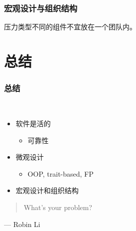 \documentclass[UTF8,lualatex]{ctexbeamer}
\newcommand{\pagequote}[2]{
  \Large
  \begin{quotation}
      #1
  \end{quotation}
  \flushright\normalsize --- {#2}
}
\begin{document}
\begin{frame}
    \frametitle{宏观设计与组织结构}
    \begin{corollary}
        压力类型不同的组件不宜放在一个团队内。
    \end{corollary}
\end{frame}

\section{总结}

\begin{frame}
    \frametitle{总结}
    \begin{block}{~}
        \begin{itemize}
            \item 软件是活的
                \begin{itemize}
                    \item 可靠性
                \end{itemize}
            \item 微观设计
                \begin{itemize}
                    \item OOP, trait-based, FP
                \end{itemize}
            \item 宏观设计和组织结构
        \end{itemize}
    \end{block}
\end{frame}

\begin{frame}
    \pagequote{What's your problem?}{Robin Li}
\end{frame}
\end{document}

